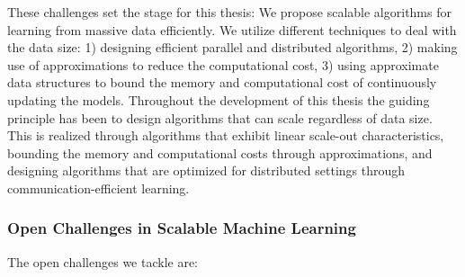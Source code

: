 These challenges set the stage for this thesis: We propose scalable algorithms
for learning from massive data efficiently. We utilize different techniques
to deal with the data size: 1) designing efficient parallel and distributed
algorithms, 2) making use of approximations to reduce the computational
cost, 3) using approximate data structures to bound the memory and computational cost
of continuously updating the models. Throughout the development of this thesis the guiding
principle has been to design algorithms that can scale regardless of data size.
This is realized through algorithms that exhibit linear scale-out characteristics,
bounding the memory and computational costs through approximations, and designing
algorithms that are optimized for distributed settings through communication-efficient
learning.


\subsubsection*{Open Challenges in Scalable Machine Learning}

The open challenges we tackle are:

